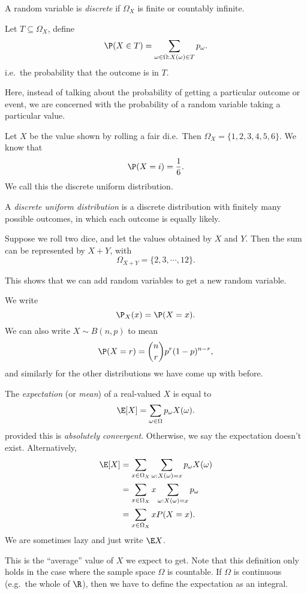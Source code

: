 \documentclass[a4paper]{article}
\begin{document}
\begin{defi}
  A random variable is \emph{discrete} if $\Omega_X$ is finite or countably infinite.
\end{defi}

\begin{notation}
  Let $T\subseteq \Omega_X$, define
  \[
    \P(X\in T) = \sum_{\omega \in \Omega: X(\omega)\in T}p_\omega.
  \]
  i.e.\ the probability that the outcome is in $T$.
\end{notation}
Here, instead of talking about the probability of getting a particular outcome or event, we are concerned with the probability of a random variable taking a particular value.

\begin{eg}
  Let $X$ be the value shown by rolling a fair di.e.\ Then $\Omega_X = \{1, 2, 3, 4, 5, 6\}$. We know that
  \[
    \P(X = i) = \frac{1}{6}.
  \]
  We call this the discrete uniform distribution.
\end{eg}
\begin{defi}
  A \emph{discrete uniform distribution} is a discrete distribution with finitely many possible outcomes, in which each outcome is equally likely.
\end{defi}

\begin{eg}
  Suppose we roll two dice, and let the values obtained by $X$ and $Y$. Then the sum can be represented by $X + Y$, with
  \[
    \Omega_{X + Y} = \{2, 3, \cdots, 12\}.
  \]
\end{eg}
This shows that we can add random variables to get a new random variable.

\begin{notation}
  We write
  \[
    \P_X(x) = \P(X = x).
  \]
  We can also write $X\sim B(n, p)$ to mean
  \[
    \P(X = r) = \binom{n}{r}p^r(1 - p)^{n - r},
  \]
  and similarly for the other distributions we have come up with before.
\end{notation}

\begin{defi}[Expectation]
  The \emph{expectation} (or \emph{mean}) of a real-valued $X$ is equal to
  \[
    \E[X] = \sum_{\omega\in \Omega}p_\omega X(\omega).
  \]
  provided this is \emph{absolutely convergent}. Otherwise, we say the expectation doesn't exist. Alternatively,
  \begin{align*}
    \E[X] &= \sum_{x\in \Omega_X}\sum_{\omega: X(\omega) = x}p_\omega X(\omega)\\
    &= \sum_{x\in \Omega_X}x\sum_{\omega:X(\omega) = x}p_\omega\\
    &= \sum_{x\in \Omega_X}xP(X = x).
  \end{align*}
  We are sometimes lazy and just write $\E X$.
\end{defi}
This is the ``average'' value of $X$ we expect to get. Note that this definition only holds in the case where the sample space $\Omega$ is countable. If $\Omega$ is continuous (e.g.\ the whole of $\R$), then we have to define the expectation as an integral.
\end{document}
